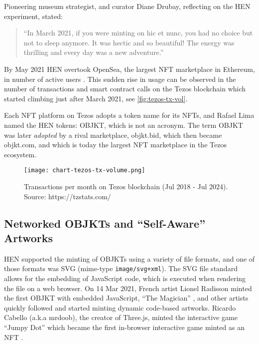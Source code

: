 Pioneering museum strategist, and curator Diane Drubay, reflecting on the HEN experiment, stated:

\begin{quotation}
``In March 2021, if you were minting on hic et nunc, you had no choice but not to sleep anymore. It was hectic and so beautiful! The energy was thrilling and every day was a new adventure.'' \cite{drubayHowHicNunc2021}
\end{quotation}


By May 2021 HEN overtook OpenSea, the largest NFT marketplace in Ethereum, in number of active users \cite{nelsonWhereAreYour2022} \cite{evansBrazilDIYEcofriendly2021}. This sudden rise in usage can be observed in the number of transactions and smart contract calls on the Tezos blockchain which started climbing just after March 2021, see \autoref{fig:tezos-tx-vol}.

Each NFT platform on Tezos adopts a token name for its NFTs, and Rafael Lima named the HEN tokens: \gls{OBJKT}, which is not an acronym.
The term OBJKT was later \emph{adopted} by a rival marketplace, objkt.bid, which then became objkt.com, and which is today the largest NFT marketplace in the Tezos ecosystem.

\begin{figure}[h]
    \centering
    \texttt{[image: chart-tezos-tx-volume.png]}
    \caption[Transactions per month on Tezos blockchain]{Transactions per month on Tezos blockchain (Jul 2018 - Jul 2024). Source: https://tzstats.com/}
    \label{fig:tezos-tx-vol}
\end{figure}

\subsection*{Networked OBJKTs and ``Self-Aware'' Artworks}

HEN supported the minting of OBJKTs using a variety of file formats, and one of those formats was SVG (mime-type \texttt{image/svg+xml}). The SVG file standard allows for the embedding of JavaScript code, which is executed when rendering the file on a web browser.  On 14 Mar 2021, French artist Lionel Radisson minted the first OBJKT with embedded JavaScript, ``The Magician''  \cite{makio135Magician2021}, and other artists quickly followed and started minting dynamic code-based artworks. Ricardo Cabello (a.k.a mrdoob), the creator of Three.js, minted the interactive game ``Jumpy Dot'' \cite{mrdoobJumpyDot2021} which became the first in-browser interactive game minted as an NFT \cite{rusherWhatDoesIt2021}.

